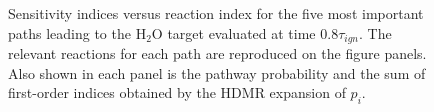 \begin{figure}[htbp]
\begin{subfigure}{0.5\textwidth}
 \label{ch3:fig13e}
 \end{subfigure}
 \caption[Sensitivity indices for the five most important paths leading to the H$_2$O target]{Sensitivity indices versus reaction index for the five most important paths leading to the H$_2$O target evaluated at time $0.8\tau_{ign}$. The relevant reactions for each path are reproduced on the figure panels. Also shown in each panel is the pathway probability and the sum of first-order indices obtained by the HDMR expansion of $p_i$.}
\label{ch3:fig13}
\end{figure}


